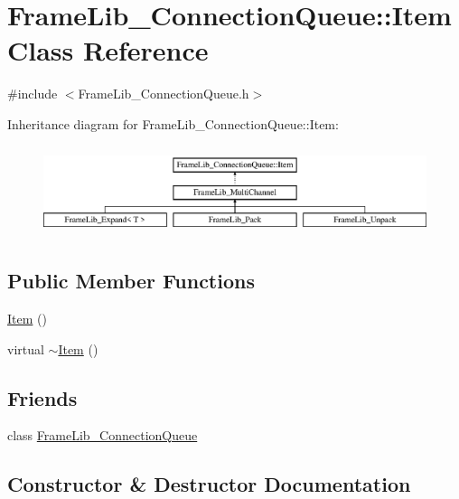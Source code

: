 \hypertarget{class_frame_lib___connection_queue_1_1_item}{}\section{Frame\+Lib\+\_\+\+Connection\+Queue\+:\+:Item Class Reference}
\label{class_frame_lib___connection_queue_1_1_item}


{\ttfamily \#include $<$Frame\+Lib\+\_\+\+Connection\+Queue.\+h$>$}

Inheritance diagram for Frame\+Lib\+\_\+\+Connection\+Queue\+:\+:Item\+:\begin{figure}[H]
\begin{center}
\leavevmode
\includegraphics[height=2.666667cm]{class_frame_lib___connection_queue_1_1_item}
\end{center}
\end{figure}
\subsection*{Public Member Functions}
\begin{DoxyCompactItemize}
\item 
\hyperlink{class_frame_lib___connection_queue_1_1_item_ab3a4126f582a0e5301a96648e2772617}{Item} ()
\item 
virtual \hyperlink{class_frame_lib___connection_queue_1_1_item_ac9363ad9ab0ad0ed00037e27c691ee8d}{$\sim$\+Item} ()
\end{DoxyCompactItemize}
\subsection*{Friends}
\begin{DoxyCompactItemize}
\item 
class \hyperlink{class_frame_lib___connection_queue_1_1_item_a5ef3645eb1ddfdf5e50dfe9a9fe7a997}{Frame\+Lib\+\_\+\+Connection\+Queue}
\end{DoxyCompactItemize}


\subsection{Constructor \& Destructor Documentation}
\mbox{\label{class_frame_lib___connection_queue_1_1_item_ab3a4126f582a0e5301a96648e2772617}} 
